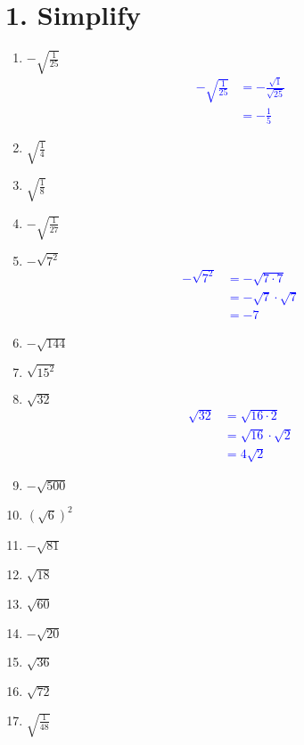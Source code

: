 \documentclass{hw}
\begin{document}
\section*{\normalsize 1. Simplify}
\begin{enumerate}[label=\alph*.]
    \item $-\sqrt{\frac{1}{25}}$
        \textcolor{blue}{
        \begin{align*}
            -\sqrt{\frac{1}{25}} &= -\frac{\sqrt{1}}{\sqrt{25}} \\
                                 &= -\frac{1}{5}
        \end{align*}
        }
    \item $\sqrt{\frac{1}{4}}$
        \studentlargeworkspace
    \item $\sqrt{\frac{1}{8}}$
        \studentxlargeworkspace
    \item $-\sqrt{\frac{1}{27}}$
        \studentxlargeworkspace
    \item $-\sqrt{7^2}$
        \textcolor{blue}{
        \begin{align*}
            -\sqrt{7^2} &= -\sqrt{7 \cdot 7} \\
                        &= -\sqrt{7} \cdot \sqrt{7} \\
                        &= -7
        \end{align*}
        }
    \item $-\sqrt{144}$
        \studentlargeworkspace
    \item $\sqrt{15^2}$
        \studentlargeworkspace
    \item $\sqrt{32}$
        \textcolor{blue}{
        \begin{align*}
            \sqrt{32} &= \sqrt{16 \cdot 2} \\
                      &= \sqrt{16} \cdot \sqrt{2} \\
                      &= 4 \sqrt{2}
        \end{align*}
        }
    \item $-\sqrt{500}$
        \studentlargeworkspace
    \item $(\sqrt{6})^2$
        \studentlargeworkspace
    \item $-\sqrt{81}$
        \studentlargeworkspace
    \item $\sqrt{18}$
        \studentlargeworkspace
    \item $\sqrt{60}$
        \studentlargeworkspace
    \item $-\sqrt{20}$
        \studentlargeworkspace
    \item $\sqrt{36}$
        \studentlargeworkspace
    \item $\sqrt{72}$
        \studentxlargeworkspace
    \item $\sqrt{\frac{1}{48}}$
        \studentxlargeworkspace
    \end{enumerate}
\end{document}
